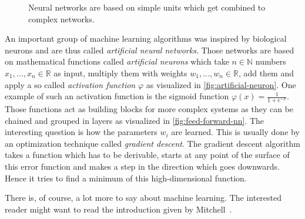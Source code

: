 \begin{figure}
\centering
{}%
\caption{Neural networks are based on simple units which get combined to complex networks.}
\label{fig:neural-style}
\end{figure}

An important group of machine learning algorithms was inspired by biological
neurons and are thus called \textit{artificial neural networks}. Those networks
are based on mathematical functions called \textit{artificial neurons} which
take $n \in \mathbb{N}$ numbers $x_1, \dots, x_n \in \mathbb{R}$ as input,
multiply them with weights $w_1, \dots, w_n \in \mathbb{R}$, add them and apply
a so called \textit{activation function} $\varphi$ as visualized in
\cref{fig:artificial-neuron}. One example of such an activation function is the
sigmoid function $\varphi(x) = \frac{1}{1+e^{-x}}$. Those functions act as
building blocks for more complex systems as they can be chained and grouped in
layers as visualized in \cref{fig:feed-forward-nn}. The interesting question is
how the parameters $w_i$ are learned. This is usually done by an optimization
technique called
\textit{gradient descent}. The gradient descent algorithm takes a function
which has to be derivable, starts at any point of the surface of this error
function and makes a step in the direction which goes downwards. Hence it tries
to find a minimum of this high-dimensional function.

There is, of course, a lot more to say about machine learning. The interested
reader might want to read the introduction given by Mitchell~\cite{Mitchell97}.
